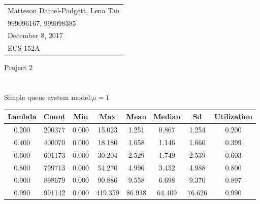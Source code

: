 \documentclass{article}
\begin{document}
	\null\hfill\begin{tabular}[t]{l@{}}
	Matteson Daniel-Padgett, Lena Tan\\
	999096167, 999098385\\
	December 8, 2017\\
	ECS 152A
\end{tabular}
	
\begin{center}	
\sc \Large Project 2
\end{center}	

\part{}
\section{}
Simple queue system model:$\mu = 1$ \\
\begin{center}
\begin{tabular}{c | c | c | c | c | c | c | c}
	Lambda & Count & Min & Max & Mean & Median & Sd & Utilization \\
	\hline
	0.200 & 200377 & 0.000 & 15.023 & 1.251 & 0.867 & 1.254 & 0.200 \\ 
	0.400 & 400070 & 0.000 & 18.180 & 1.658 & 1.146 & 1.660 & 0.399 \\ 
	0.600 & 601173 & 0.000 & 30.204 & 2.529 & 1.749 & 2.539 & 0.603 \\ 
	0.800 & 799713 & 0.000 & 54.270 & 4.996 & 3.452 & 4.988 & 0.800 \\ 
	0.900 & 898679 & 0.000 & 90.886 & 9.558 & 6.698 & 9.370 & 0.897 \\
	0.990 & 991142 & 0.000 & 419.359 & 86.938 & 64.409 & 76.626 & 0.990 \\
\end{tabular} \\
\end{center}
\end{document}
